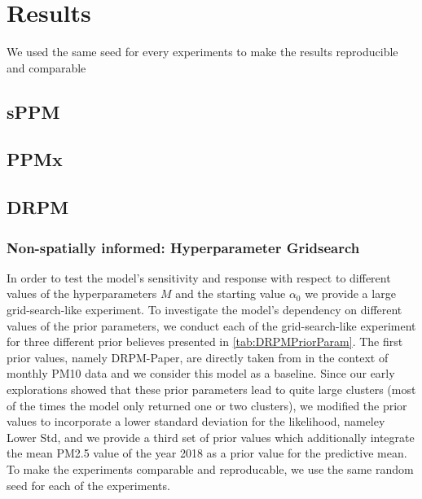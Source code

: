 \documentclass[12pt,a4paper]{article}
\begin{document}
\newpage

\section{Results}
We used the same seed for every experiments to make the results
reproducible and comparable
\subsection{sPPM}
\subsection{PPMx}
\subsection{DRPM}

\subsubsection{Non-spatially informed: Hyperparameter Gridsearch}
\label{subsubsec:DPRMNoSpatialGridsearch}
In order to test the model's sensitivity and response with respect to different values of the hyperparameters $M$ and the starting value
$\alpha_0$ we provide a large grid-search-like experiment. To investigate the model's dependency on different values of the prior parameters,
we conduct each of the grid-search-like experiment for three different prior believes presented in \cref{tab:DRPMPriorParam}. The first
prior values, namely DRPM-Paper, are directly taken from \cite[Section 4.1]{Page2021-Temporal} in the context of monthly PM10 data
and we consider this model as a baseline. Since our early explorations showed that these prior parameters lead to quite large clusters
(most of the times the model only returned one or two clusters), we modified the prior values to incorporate a lower standard deviation
for the likelihood, nameley Lower Std, and we provide a third set of prior values which additionally integrate the mean PM2.5 value
of the year 2018 as a prior value for the predictive mean. To make the experiments comparable and reproducable, we use the same
random seed for each of the experiments.
\end{document}
